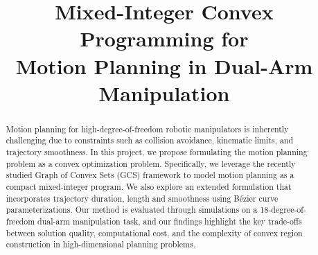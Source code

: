 \documentclass[conference]{IEEEtran}
\begin{document}
\title{Mixed-Integer Convex Programming for \\Motion Planning in Dual-Arm Manipulation}

\author{
}

\maketitle

\begin{abstract}
Motion planning for high-degree-of-freedom robotic manipulators is inherently challenging due to constraints such as collision avoidance, kinematic limits, and trajectory smoothness. In this project, we propose formulating the motion planning problem as a convex optimization problem. Specifically, we leverage the recently studied Graph of Convex Sets (GCS) framework to model motion planning as a compact mixed-integer program. We also explore an extended formulation that incorporates trajectory duration, length and smoothness using B\'ezier curve parameterizations. Our method is evaluated through simulations on a 18-degree-of-freedom dual-arm manipulation task, and our findings highlight the key trade-offs between solution quality, computational cost, and the complexity of convex region construction in high-dimensional planning problems.
\end{abstract}









\appendices

\end{document}
